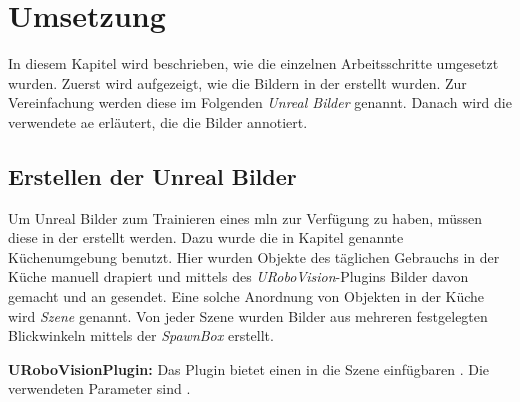 \graphicspath{{./images/}}      
\def\CHAPTERONE{./chapters/Chapter-1} 

\chapter{Umsetzung}
\label{chap:implementation}
%	

In diesem Kapitel wird beschrieben, wie die einzelnen Arbeitsschritte umgesetzt wurden. Zuerst wird aufgezeigt, wie die Bildern in der \unreal erstellt wurden. Zur Vereinfachung werden diese  im Folgenden \textit{Unreal Bilder} genannt. Danach wird die verwendete \gls{ae} erläutert, die die Bilder annotiert. 

\section{Erstellen der Unreal Bilder}
\label{sec:takingpics}
Um Unreal Bilder zum Trainieren eines \gls{mln} zur Verfügung zu haben, müssen diese in der \unreal erstellt werden. Dazu wurde die in Kapitel  genannte Küchenumgebung benutzt. Hier wurden Objekte des täglichen Gebrauchs in der Küche manuell drapiert und mittels des \textit{URoboVision}-Plugins Bilder davon gemacht und an \robosherlock gesendet. Eine solche Anordnung von Objekten in der Küche wird \textit{Szene} genannt. Von jeder Szene wurden Bilder aus mehreren festgelegten Blickwinkeln mittels der \textit{SpawnBox} erstellt. \par 

\textbf{URoboVisionPlugin:} Das Plugin bietet einen in die Szene einfügbaren . Die verwendeten Parameter sind . \par 

